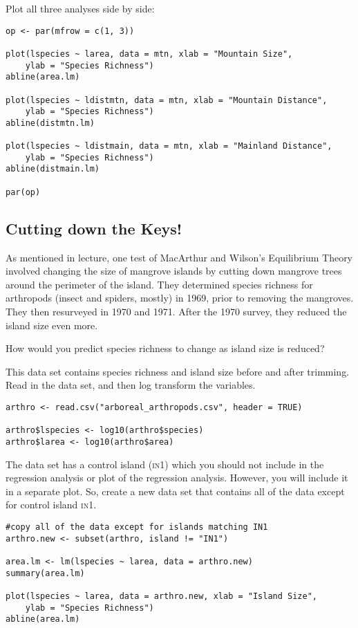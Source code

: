 \documentclass[11pt]{article}
\begin{document}
\vspace{3\baselineskip}


Plot all three analyses side by side:

\begin{verbatim}
op <- par(mfrow = c(1, 3))

plot(lspecies ~ larea, data = mtn, xlab = "Mountain Size",  
    ylab = "Species Richness")
abline(area.lm)

plot(lspecies ~ ldistmtn, data = mtn, xlab = "Mountain Distance",
    ylab = "Species Richness")
abline(distmtn.lm)

plot(lspecies ~ ldistmain, data = mtn, xlab = "Mainland Distance",
    ylab = "Species Richness")
abline(distmain.lm)

par(op)
\end{verbatim}


\subsection*{Cutting down the Keys!}

As mentioned in lecture, one test of MacArthur and Wilson's Equilibrium Theory involved changing the size of mangrove islands by cutting down mangrove trees around the perimeter of the island.  They determined species richness for arthropods (insect and spiders, mostly) in 1969, prior to removing the mangroves. They then resurveyed in 1970 and 1971.  After the 1970 survey, they reduced the island size even more. 

How would you predict species richness to change as island size is reduced?

This data set contains species richness and island size before and after trimming.  Read in the data set, and then log transform the variables.

\begin{verbatim}
arthro <- read.csv("arboreal_arthropods.csv", header = TRUE)

arthro$lspecies <- log10(arthro$species)
arthro$larea <- log10(arthro$area)
\end{verbatim}

The data set has a control island (\textsc{in}1) which you should not include in the regression analysis or plot of the regression analysis.  However, you will include it in a separate plot.  So,  create a new data set that contains all of the data except for control island \textsc{in}1.

\newpage

\begin{verbatim}
#copy all of the data except for islands matching IN1
arthro.new <- subset(arthro, island != "IN1")  

area.lm <- lm(lspecies ~ larea, data = arthro.new)
summary(area.lm)

plot(lspecies ~ larea, data = arthro.new, xlab = "Island Size",
    ylab = "Species Richness")
abline(area.lm)
\end{verbatim}
\end{document}
